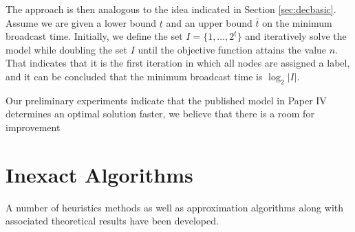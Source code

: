 The approach is then analogous to the idea indicated in Section \ref{sec:decbasic}.
Assume we are given a lower bound $\underline{t}$ and an upper bound $\bar{t}$ on the minimum broadcast time.
Initially, we define the set $I=\{1,\dots,2^{\underline{t}}\}$ and iteratively solve the model while doubling the set $I$ until the objective function attains the value $n$.
That indicates that it is the first iteration in which all nodes are assigned a label, and it can be concluded that the minimum broadcast time is $\log_2|I|$.



Our preliminary experiments indicate that the published model in Paper IV determines an optimal solution faster, we believe that there is a room for improvement 


\section{Inexact Algorithms}

A number of heuristics methods as well as approximation algorithms along with associated theoretical results have been developed.

